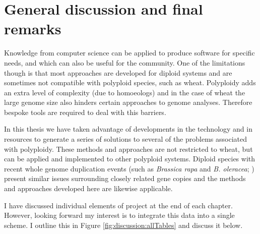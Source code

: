 
\chapter[General discussion]{General discussion and final remarks}
\label{cha:discussion}



Knowledge from  computer science can be applied to produce software for specific needs, and which can also be useful for the community. 
One of the limitations though is that most approaches are developed for diploid systems and are sometimes not compatible with polyploid species, such as wheat. 
Polyploidy adds an extra level of complexity (due to homoeologs) and in the case of wheat the large genome size also hinders certain approaches to genome analyses. Therefore bespoke tools are required to deal with this barriers. 

In this thesis we have taken advantage of developments in the technology and in resources to generate a series of solutions to several of the problems associated with polyploidy. These methods and approaches are not restricted to wheat, but can be applied and implemented to other polyploid systems.
Diploid species with recent whole genome duplication events (such as \textit{Brassica rapa} and \textit{B. oleracea}; \citealt{Cheng2014}) present similar issues surrounding closely related gene copies and the methods and approaches developed here are likewise applicable.

I have discussed individual elements of project at the end of each chapter. However, looking forward my interest is to integrate this data into a single scheme. I outline this in Figure \ref{fig:discussion:allTables} and discuss it below. 

